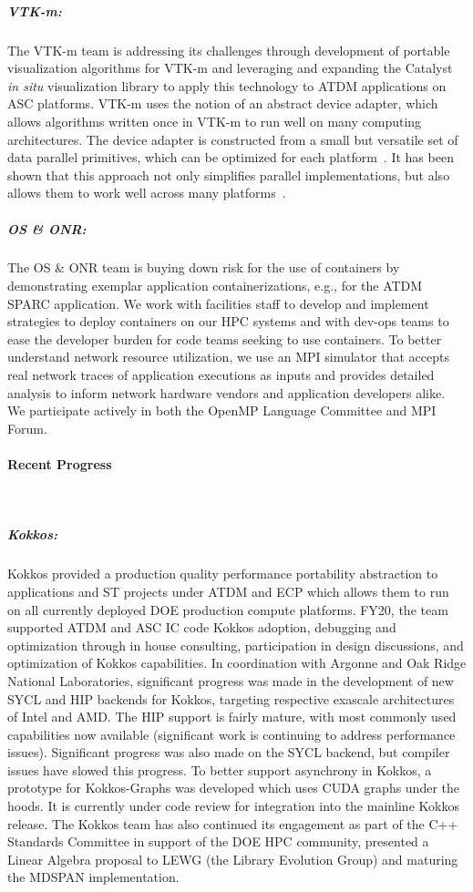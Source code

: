 \subparagraph{VTK-m:} The VTK-m team is addressing its challenges through
development of portable visualization algorithms for VTK-m and leveraging and
expanding the Catalyst~\cite{Catalyst}  \emph{in situ} visualization library to
apply this technology to ATDM applications on ASC platforms.  VTK-m uses the
notion of an abstract device adapter, which allows algorithms written once in
VTK-m to run well on many computing architectures.  The device adapter is
constructed from a small but versatile set of data parallel primitives, which
can be optimized for each platform~\cite{Blelloch1990}.  It has been shown that
this approach not only simplifies parallel implementations, but also allows
them to work well across many platforms~\cite{Lo2012,Larsen2015,Moreland2015}.

\subparagraph{OS \& ONR:} The OS \& ONR team is buying down risk for the use of containers by demonstrating exemplar application containerizations, e.g., for the ATDM SPARC application.  We work with facilities staff to develop and implement strategies to deploy containers on our HPC systems and with dev-ops teams to ease the developer burden for code teams seeking to use containers.  To better understand network resource utilization, we use an MPI simulator that accepts real network traces of application executions as inputs and provides detailed analysis to inform network hardware vendors and application developers alike.  We participate actively in both the OpenMP Language Committee and MPI Forum.



\paragraph{Recent Progress} \leavevmode \\


\subparagraph{Kokkos:}  Kokkos provided a production quality performance portability abstraction to applications and ST projects under ATDM and ECP which allows them to run on all currently deployed DOE production compute platforms. FY20, the team supported ATDM and ASC IC code Kokkos adoption, debugging and optimization through in house consulting, participation in design discussions, and optimization of Kokkos capabilities.  In coordination with Argonne and Oak Ridge National Laboratories, significant progress was made in the development of new SYCL and HIP backends for Kokkos, targeting respective exascale architectures of Intel and AMD.  The HIP support is fairly mature, with most commonly used capabilities now available (significant work is continuing to address performance issues).  Significant progress was also made on the SYCL backend, but compiler issues have slowed this progress.  To better support asynchrony in Kokkos, a prototype for Kokkos-Graphs was developed which uses CUDA graphs under the hoods. It is currently under code review for integration into the mainline Kokkos release.  The Kokkos team has also continued its engagement as part of the C++ Standards Committee in support of the DOE HPC community, presented a Linear Algebra proposal to LEWG (the Library Evolution Group) and maturing the MDSPAN implementation. 


